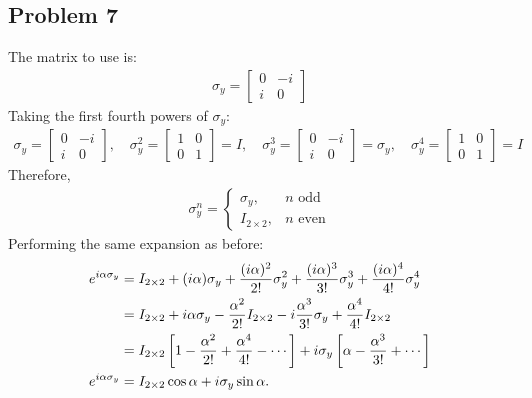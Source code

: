 \documentclass[letterpaper,11pt,twoside]{article}
\begin{document}
\subsection*{Problem 7}
The matrix to use is:
\begin{align*}
  \sigma_y=\begin{bmatrix}
    0&-i\\i&0
  \end{bmatrix}
\end{align*}
Taking the first fourth powers of $\sigma_y$:
\begin{align*}
\sigma_y=\begin{bmatrix}
  0&-i\\i&0
\end{bmatrix},\quad\sigma_y^2=\begin{bmatrix}
  1&0\\0&1
\end{bmatrix}=I,\quad\sigma_y^3=\begin{bmatrix}
  0&-i\\i&0
\end{bmatrix}=\sigma_y,\quad\sigma_y^4=\begin{bmatrix}
  1&0\\0&1
\end{bmatrix}=I
\end{align*}
Therefore,
\begin{align*}
  \sigma_y^n=\begin{cases}
    \sigma_y,&\text{$n$ odd}\\
    I_{2\times2},&\text{$n$ even}
  \end{cases}
\end{align*}
Performing the same expansion as before:
\begin{align}
  e^{i\alpha\sigma_y}&=I_{2\times2}+(i\alpha)\sigma_y+\frac{(i\alpha)^2}{2!}\sigma_y^2+\frac{(i\alpha)^3}{3!}\sigma_y^3+\frac{(i\alpha)^4}{4!}\sigma_y^4\notag\\
  &=I_{2\times2}+i\alpha\sigma_y-\frac{\alpha^2}{2!}I_{2\times2}-i\frac{\alpha^3}{3!}\sigma_y+\frac{\alpha^4}{4!}I_{2\times2}\notag\\
  &=I_{2\times2}\left[1-\frac{\alpha^2}{2!}+\frac{\alpha^4}{4!}-\cdots\right]+i\sigma_y\left[\alpha-\frac{\alpha^3}{3!}+\cdots\right]\notag\\
  e^{i\alpha\sigma_y}&=I_{2\times2}\cos\alpha+i\sigma_y\sin\alpha.
\end{align}
\end{document}
